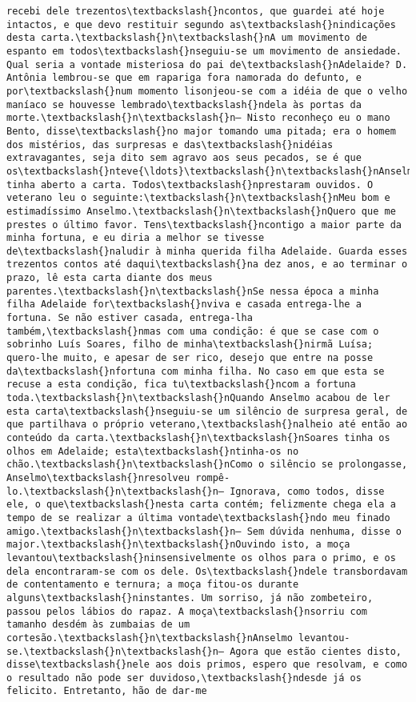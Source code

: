 \begin{Verbatim}[commandchars=\\\{\}]
recebi dele trezentos\textbackslash{}ncontos, que guardei até hoje intactos, e que devo restituir segundo as\textbackslash{}nindicações desta carta.\textbackslash{}n\textbackslash{}nA um movimento de espanto em todos\textbackslash{}nseguiu-se um movimento de ansiedade. Qual seria a vontade misteriosa do pai de\textbackslash{}nAdelaide? D. Antônia lembrou-se que em rapariga fora namorada do defunto, e por\textbackslash{}num momento lisonjeou-se com a idéia de que o velho maníaco se houvesse lembrado\textbackslash{}ndela às portas da morte.\textbackslash{}n\textbackslash{}n— Nisto reconheço eu o mano Bento, disse\textbackslash{}no major tomando uma pitada; era o homem dos mistérios, das surpresas e das\textbackslash{}nidéias extravagantes, seja dito sem agravo aos seus pecados, se é que os\textbackslash{}nteve{\ldots}\textbackslash{}n\textbackslash{}nAnselmo tinha aberto a carta. Todos\textbackslash{}nprestaram ouvidos. O veterano leu o seguinte:\textbackslash{}n\textbackslash{}nMeu bom e estimadíssimo Anselmo.\textbackslash{}n\textbackslash{}nQuero que me prestes o último favor. Tens\textbackslash{}ncontigo a maior parte da minha fortuna, e eu diria a melhor se tivesse de\textbackslash{}naludir à minha querida filha Adelaide. Guarda esses trezentos contos até daqui\textbackslash{}na dez anos, e ao terminar o prazo, lê esta carta diante dos meus parentes.\textbackslash{}n\textbackslash{}nSe nessa época a minha filha Adelaide for\textbackslash{}nviva e casada entrega-lhe a fortuna. Se não estiver casada, entrega-lha também,\textbackslash{}nmas com uma condição: é que se case com o sobrinho Luís Soares, filho de minha\textbackslash{}nirmã Luísa; quero-lhe muito, e apesar de ser rico, desejo que entre na posse da\textbackslash{}nfortuna com minha filha. No caso em que esta se recuse a esta condição, fica tu\textbackslash{}ncom a fortuna toda.\textbackslash{}n\textbackslash{}nQuando Anselmo acabou de ler esta carta\textbackslash{}nseguiu-se um silêncio de surpresa geral, de que partilhava o próprio veterano,\textbackslash{}nalheio até então ao conteúdo da carta.\textbackslash{}n\textbackslash{}nSoares tinha os olhos em Adelaide; esta\textbackslash{}ntinha-os no chão.\textbackslash{}n\textbackslash{}nComo o silêncio se prolongasse, Anselmo\textbackslash{}nresolveu rompê-lo.\textbackslash{}n\textbackslash{}n— Ignorava, como todos, disse ele, o que\textbackslash{}nesta carta contém; felizmente chega ela a tempo de se realizar a última vontade\textbackslash{}ndo meu finado amigo.\textbackslash{}n\textbackslash{}n— Sem dúvida nenhuma, disse o major.\textbackslash{}n\textbackslash{}nOuvindo isto, a moça levantou\textbackslash{}ninsensivelmente os olhos para o primo, e os dela encontraram-se com os dele. Os\textbackslash{}ndele transbordavam de contentamento e ternura; a moça fitou-os durante alguns\textbackslash{}ninstantes. Um sorriso, já não zombeteiro, passou pelos lábios do rapaz. A moça\textbackslash{}nsorriu com tamanho desdém às zumbaias de um cortesão.\textbackslash{}n\textbackslash{}nAnselmo levantou-se.\textbackslash{}n\textbackslash{}n— Agora que estão cientes disto, disse\textbackslash{}nele aos dois primos, espero que resolvam, e como o resultado não pode ser duvidoso,\textbackslash{}ndesde já os felicito. Entretanto, hão de dar-me 
\end{Verbatim}
